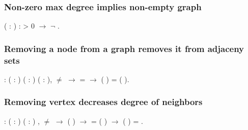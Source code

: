\subsubsection{Non-zero max degree implies non-empty graph}


\begin{coqdoccode}
\coqdocemptyline
\coqdocnoindent
{}  ( : ) :   > 0 \ensuremath{\rightarrow} \ensuremath{\lnot}  .\coqdoceol
\coqdocemptyline
\end{coqdoccode}
\subsubsection{Removing a node from a graph removes it from adjaceny sets}


\begin{coqdoccode}
\coqdocnoindent
{}  :\coqdoceol
\coqdocindent{1.00em}
\coqdockw{\ensuremath{\forall}} ( : ) (  : ) ( : ),\coqdoceol
\coqdocindent{2.00em}
 \ensuremath{\not=}  \ensuremath{\rightarrow}\coqdoceol
\coqdocindent{2.00em}
   =   \ensuremath{\rightarrow}\coqdoceol
\coqdocindent{2.00em}
  (  ) =  (  ).\coqdoceol
\coqdocemptyline
\end{coqdoccode}
\subsubsection{Removing vertex decreases degree of neighbors}


\begin{coqdoccode}
\coqdocemptyline
\coqdocnoindent
{}  : \coqdockw{\ensuremath{\forall}} ( : ) (  : ) ,\coqdoceol
\coqdocindent{2.00em}
 \ensuremath{\not=}  \ensuremath{\rightarrow}\coqdoceol
\coqdocindent{2.00em}
  (  ) \ensuremath{\rightarrow}\coqdoceol
\coqdocindent{2.00em}
   =  ( ) \ensuremath{\rightarrow}\coqdoceol
\coqdocindent{2.00em}
  (  ) =  .\coqdoceol
\coqdocemptyline
\end{coqdoccode}
